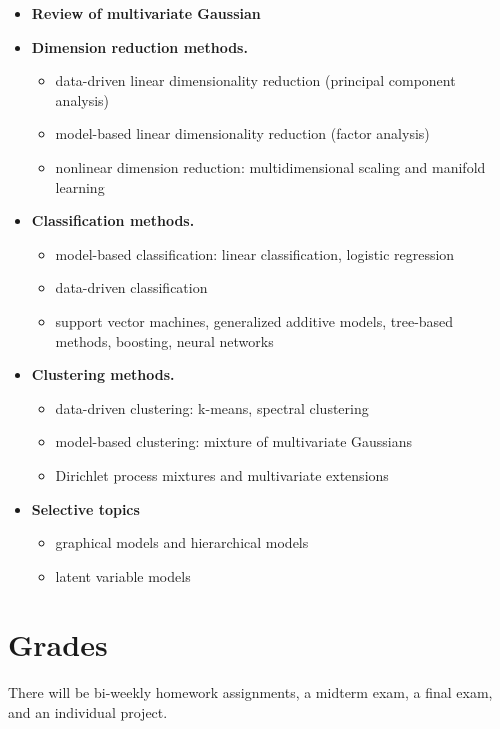\documentclass[12pt]{book}
\theoremstyle{definition}
\theoremstyle{remark}
\begin{document}
\begin{itemize}
	\item \textbf{Review of multivariate Gaussian}
		
	\item \textbf{Dimension reduction methods.}
	\begin{itemize}
		\item data-driven linear dimensionality reduction (principal component analysis)
		\item model-based linear dimensionality reduction (factor analysis)
		\item nonlinear dimension reduction: multidimensional scaling and manifold learning
	\end{itemize}
		
	\item \textbf{Classification methods.}
	\begin{itemize}
		\item model-based classification: linear classification, logistic regression
		\item data-driven classification
		\item support vector machines, generalized additive models, tree-based methods,
			boosting, neural networks
	\end{itemize}
		
	\item \textbf{Clustering methods.}
	\begin{itemize}
		\item data-driven clustering: k-means, spectral clustering
		\item model-based clustering: mixture of multivariate Gaussians
		\item Dirichlet process mixtures and multivariate extensions
	\end{itemize}
		
	\item \textbf{Selective topics}
	\begin{itemize}
		\item graphical models and hierarchical models
		\item latent variable models
	\end{itemize}
\end{itemize}

\section{Grades}
There will be bi-weekly homework assignments, a midterm exam, a final exam, and an individual project.
\end{document}
